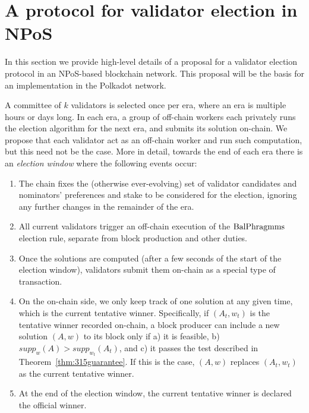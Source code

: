 
\section{A protocol for validator election in NPoS}\label{s:objectives}

In this section we provide high-level details of a proposal for a validator election protocol in an NPoS-based blockchain network. This proposal will be the basis for an implementation in the Polkadot network.

A committee of $k$ validators is selected once per era, where an era is multiple hours or days long. 
In each era, a group of off-chain workers each privately runs the election algorithm for the next era, and submits its solution on-chain. 
We propose that each validator act as an off-chain worker and run such computation, but this need not be the case. 
More in detail, towards the end of each era there is an \emph{election window} where the following events occur:
\begin{enumerate}
\item The chain fixes the (otherwise ever-evolving) set of validator candidates and nominators' preferences and stake to be considered for the election, ignoring any further changes in the remainder of the era. 
\item All current validators trigger an off-chain execution of the $\operatorname{BalPhragmms}$ election rule, separate from block production and other duties.
\item Once the solutions are computed (after a few seconds of the start of the election window), validators submit them on-chain as a special type of transaction. 
\item On the on-chain side, we only keep track of one solution at any given time, which is the current tentative winner. Specifically, if $(A_t,w_t)$ is the tentative winner recorded on-chain, a block producer can include a new solution $(A,w)$ to its block only if a) it is feasible, b) $supp_w(A)>supp_{w_t}(A_t)$, and c) it passes the test described in Theorem~\ref{thm:315guarantee}. If this is the case, $(A,w)$ replaces $(A_t, w_t)$ as the current tentative winner. 
\item At the end of the election window, the current tentative winner is declared the official winner. 
\end{enumerate}

